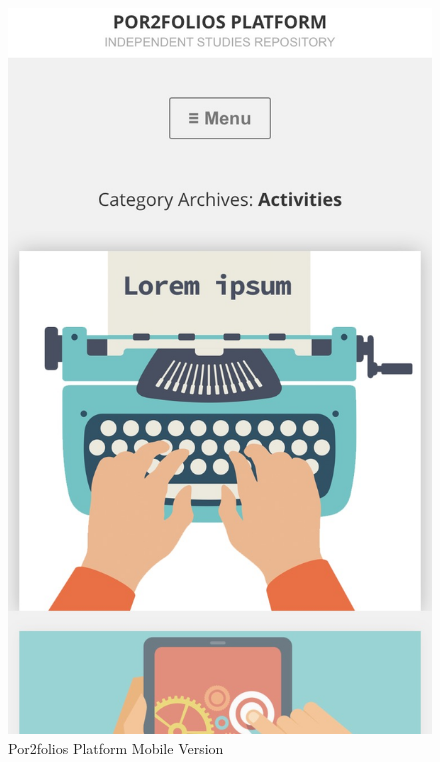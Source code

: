 \documentclass[a4paper,12pt,journal,twoside,compsoc]{PPIEEEtran}
\begin{document}
\begin{figure}[htb]
\centering
\includegraphics[width=1\linewidth]{mobile}
\caption{Por2folios Platform Mobile Version}
\label{fig_mobile}
\end{figure}


\end{document}

